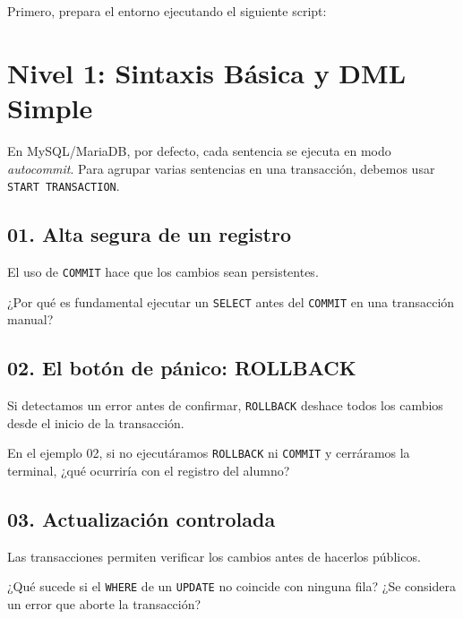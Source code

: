 \documentclass[12pt,a4paper]{article}
\begin{document}
Primero, prepara el entorno ejecutando el siguiente script:



\section{Nivel 1: Sintaxis Básica y DML Simple}
En MySQL/MariaDB, por defecto, cada sentencia se ejecuta en modo \textit{autocommit}. Para agrupar varias sentencias en una transacción, debemos usar \texttt{START TRANSACTION}.

\subsection{01. Alta segura de un registro}
El uso de \texttt{COMMIT} hace que los cambios sean persistentes.


\begin{tcolorbox}[title=Reflexión 1]
¿Por qué es fundamental ejecutar un \texttt{SELECT} antes del \texttt{COMMIT} en una transacción manual?
\end{tcolorbox}

\subsection{02. El botón de pánico: ROLLBACK}
Si detectamos un error antes de confirmar, \texttt{ROLLBACK} deshace todos los cambios desde el inicio de la transacción.


\begin{tcolorbox}[title=Reflexión 2]
En el ejemplo 02, si no ejecutáramos \texttt{ROLLBACK} ni \texttt{COMMIT} y cerráramos la terminal, ¿qué ocurriría con el registro del alumno?
\end{tcolorbox}

\subsection{03. Actualización controlada}
Las transacciones permiten verificar los cambios antes de hacerlos públicos.


\begin{tcolorbox}[title=Reflexión 3]
¿Qué sucede si el \texttt{WHERE} de un \texttt{UPDATE} no coincide con ninguna fila? ¿Se considera un error que aborte la transacción?
\end{tcolorbox}
\end{document}
